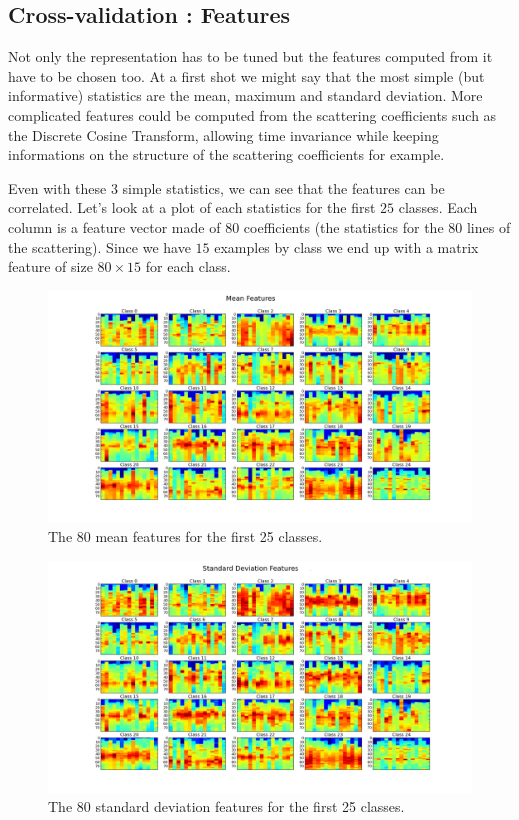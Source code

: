 \documentclass[a4paper]{report}
\begin{document}
\subsection{Cross-validation : Features}
Not only the representation has to be tuned but the features computed from it have to be chosen too. At a first shot we might say that the most simple (but  informative) statistics are the mean, maximum and standard deviation. More complicated features could be computed from the scattering coefficients such as the Discrete Cosine Transform, allowing time invariance while keeping informations on the structure of the scattering coefficients for example.

Even with these $3$ simple statistics, we can see that the features can be correlated. Let's look at a plot of each statistics for the first $25$ classes. Each column is a feature vector made of $80$ coefficients (the statistics for the $80$ lines of the scattering). Since we have $15$ examples by class we end up with a matrix feature of size $80\times 15$ for each class.
\begin{figure}[H]
\begin{center}
\includegraphics[scale=0.25]{mean_S0.png}\caption{The 80 mean features for the first 25 classes.}\label{meanfeatures}
\end{center}
\end{figure}

\begin{figure}[H]
\begin{center}
\includegraphics[scale=0.25]{std_S0.png}\caption{The 80 standard deviation features for the first 25 classes.}\label{stdfeatures}
\end{center}
\end{figure}
\end{document}
